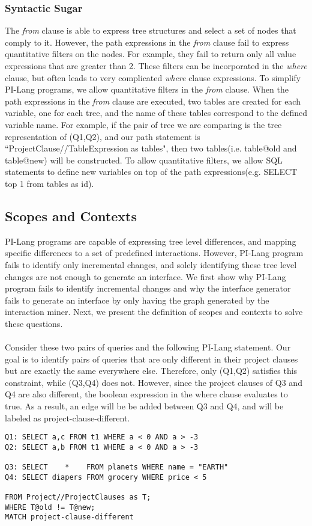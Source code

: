 \subsubsection{Syntactic Sugar}
The \emph{from} clause is able to express tree structures and select a set of nodes that comply to it. However, the path expressions in the \emph{from} clause fail to express quantitative filters on the nodes. For example, they fail to return only all value expressions that are greater than 2. These filters can be incorporated in the \emph{where} clause, but often leads to very complicated \emph{where} clause expressions. To simplify PI-Lang programs, we allow quantitative filters in the \emph{from} clause. When the path expressions in the \emph{from} clause are executed, two tables are created for each variable, one for each tree, and the name of these tables correspond to the defined variable name. For example, if the pair of tree we are comparing is the tree representation of (Q1,Q2), and our path statement is ``ProjectClause//TableExpression as tables", then two tables(i.e. table@old and table@new) will be constructed. To allow quantitative filters, we allow SQL statements to define new variables on top of the path expressions(e.g. SELECT top 1 from tables as id).

\subsection{Scopes and Contexts}
PI-Lang programs are capable of expressing tree level differences, and mapping specific differences to a set of predefined interactions. However, PI-Lang program fails to identify only incremental changes, and solely identifying these tree level changes are not enough to generate an interface. We first show why PI-Lang program fails to identify incremental changes and why the interface generator fails to generate an interface by only having the graph generated by the interaction miner. Next, we present the definition of scopes and contexts to solve these questions.\\\\
Consider these two pairs of queries and the following PI-Lang statement. Our goal is to identify pairs of queries that are only different in their project clauses but are exactly the same everywhere else. Therefore, only (Q1,Q2) satisfies this constraint, while (Q3,Q4) does not. However, since the project clauses of Q3 and Q4 are also different, the boolean expression in the where clause evaluates to true. As a result, an edge will be be added between Q3 and Q4, and will be labeled as project-clause-different.
\begin{verbatim}
Q1: SELECT a,c FROM t1 WHERE a < 0 AND a > -3
Q2: SELECT a,b FROM t1 WHERE a < 0 AND a > -3

Q3: SELECT    *    FROM planets WHERE name = "EARTH"
Q4: SELECT diapers FROM grocery WHERE price < 5

FROM Project//ProjectClauses as T;
WHERE T@old != T@new;
MATCH project-clause-different
\end{verbatim}

